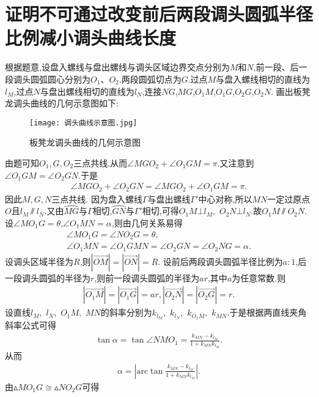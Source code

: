 \documentclass[lang=cn,newtx,10pt,scheme=chinese]{../Template/elegantbook}
\begin{document}
\section{证明不可通过改变前后两段调头圆弧半径比例减小调头曲线长度}\label{section4.1}

根据题意,设盘入螺线与盘出螺线与调头区域边界交点分别为$M$和$N$,前一段、后一段调头圆弧圆心分别为$O_1、O_2$.两段圆弧切点为$G$.过点$M$与盘入螺线相切的直线为$l_M$,过点$N$与盘出螺线相切的直线为$l_N$,连接$NG$,$MG$,$O_1M$,$O_1G$,$O_2G$,$O_2N$.
画出板凳龙调头曲线的几何示意图如下:
\begin{figure}[htbp]
\centering
\texttt{[image: 调头曲线示意图.jpg]}
\caption{板凳龙调头曲线的几何示意图}
\label{figure1}
\end{figure}
由题可知$O_1,G,O_2$三点共线,从而$\angle MGO_2+\angle O_1GM=\pi .$又注意到$\angle O_1GM=\angle O_2GN$.于是
\begin{align}
\angle MGO_2+\angle O_2GN=\angle MGO_2+\angle O_1GM=\pi .
\end{align}
因此$M,G,N$三点共线.
因为盘入螺线$\varGamma$与盘出螺线$\varGamma'$中心对称,所以$MN$一定过原点$O$且$l_M \varparallel  l_N$.又由$\wideparen{MG}$与$\varGamma$相切,$\wideparen{GN}$与$\varGamma'$相切,可得$O_1M\bot l_M,$ $O_2N\bot l_N$.故$O_1M \varparallel O_2N$.设$\angle MO_1G=\theta$,$\angle O_1MN=\alpha$,则由几何关系易得
\begin{gather}
\angle MO_1G=\angle NO_2G=\theta,
\\
\angle O_1MN=\angle O_1GMN=\angle O_2GN=\angle O_2NG=\alpha .
\end{gather}
设调头区域半径为$R$,则$\left| \overrightarrow{OM} \right|=\left| \overrightarrow{ON} \right|=R$. 设前后两段调头圆弧半径比例为$a:1$,后一段调头圆弧的半径为$r$,则前一段调头圆弧的半径为$ar$,其中$a$为任意常数.则
\begin{align}
\left| \overrightarrow{O_1M} \right|=\left| \overrightarrow{O_1G} \right|=ar,\left| \overrightarrow{O_2N} \right|=\left| \overrightarrow{O_2G} \right|=r.    
\end{align}
设直线$l_M,$ $l_N,$ $O_1M,$ $MN$的斜率分别为$k_{l_M},$ $k_{l_N},$ $k_{O_1M},$ $k_{MN}$.于是根据两直线夹角斜率公式可得
\begin{align}
\tan \alpha =\tan \angle NMO_1=\frac{k_{MN}-k_{l_M}}{1+k_{MN}k_{l_M}}.
\end{align}
从而
\begin{align}
\alpha =\left| \mathrm{arc}\tan \frac{k_{MN}-k_{l_M}}{1+k_{MN}k_{l_M}} \right|.
\end{align}
由$\vartriangle MO_1G\cong \vartriangle NO_2G$可得
\end{document}
